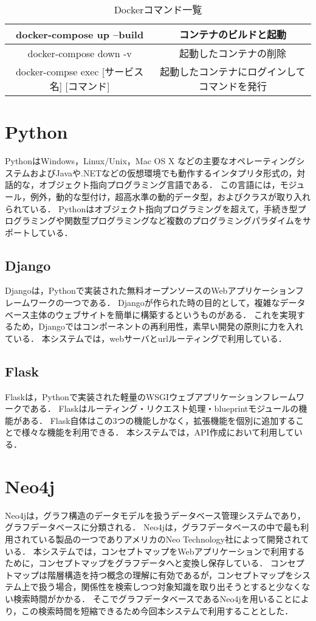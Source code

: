 \begin{table}[htb]
\centering
\caption{Dockerコマンド一覧}
\label{tab:docker_cmd}
\begin{tabular}{|c|c|}  \hline
    docker-compose up --build & コンテナのビルドと起動 \\ \hline
    docker-compose down -v & 起動したコンテナの削除 \\ \hline
    docker-compse exec [サービス名] [コマンド] & 起動したコンテナにログインしてコマンドを発行 \\ \hline		  
\end{tabular}
\end{table}

\section{Python}\label{sec:python}
Python\cite{python}はWindows，Linux/Unix，Mac OS X などの主要なオペレーティングシステムおよびJavaや.NETなどの仮想環境でも動作するインタプリタ形式の，対話的な，オブジェクト指向プログラミング言語である．
この言語には，モジュール，例外，動的な型付け，超高水準の動的データ型，およびクラスが取り入れられている．
Pythonはオブジェクト指向プログラミングを超えて，手続き型プログラミングや関数型プログラミングなど複数のプログラミングパラダイムをサポートしている．

\subsection{Django}
Django\cite{Django}は，Pythonで実装された無料オープンソースのWebアプリケーションフレームワークの一つである．
Djangoが作られた時の目的として，複雑なデータベース主体のウェブサイトを簡単に構築するというものがある．
これを実現するため，Djangoではコンポーネントの再利用性，素早い開発の原則に力を入れている．
本システムでは，webサーバとurlルーティングで利用している．

\subsection{Flask}
Flask\cite{flask}は，Pythonで実装された軽量のWSGI\cite{wsgi}ウェブアプリケーションフレームワークである．
Flaskはルーティング・リクエスト処理・blueprintモジュールの機能がある．
Flask自体はこの3つの機能しかなく，拡張機能を個別に追加することで様々な機能を利用できる．
本システムでは，API作成において利用している．

\section{Neo4j}\label{sec:neo4j}
Neo4j\cite{neo4j}は，グラフ構造のデータモデルを扱うデータベース管理システムであり，グラフデータベースに分類される．
Neo4jは，グラフデータベースの中で最も利用されている製品の一つでありアメリカのNeo Technology社によって開発されている．
本システムでは，コンセプトマップをWebアプリケーションで利用するために，コンセプトマップをグラフデータへと変換し保存している．
コンセプトマップは階層構造を持つ概念の理解に有効であるが，コンセプトマップをシステム上で扱う場合，関係性を検索しつつ対象知識を取り出そうとすると少なくない検索時間がかかる．
そこでグラフデータベースであるNeo4jを用いることにより，この検索時間を短縮できるため今回本システムで利用することとした．

